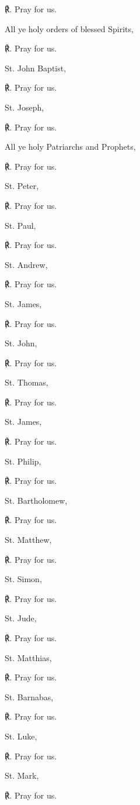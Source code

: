 \begin{multicols}{2}
℟. Pray for us.\par\noindent
All ye holy orders of blessed Spirits,\par
℟. Pray for us.\par\noindent
St. John Baptist,\par
℟. Pray for us.\par\noindent
St. Joseph,\par
℟. Pray for us.\par\noindent
All ye holy Patriarchs and Prophets,\par
℟. Pray for us.\par\noindent
St. Peter,\par
℟. Pray for us.\par\noindent
St. Paul,\par
℟. Pray for us.\par\noindent
St. Andrew,\par
℟. Pray for us.\par\noindent
St. James,\par
℟. Pray for us.\par\noindent
St. John,\par
℟. Pray for us.\par\noindent
St. Thomas,\par
℟. Pray for us.\par\noindent
St. James,\par
℟. Pray for us.\par\noindent
St. Philip,\par
℟. Pray for us.\par\noindent
St. Bartholomew,\par
℟. Pray for us.\par\noindent
St. Matthew,\par
℟. Pray for us.\par\noindent
St. Simon,\par
℟. Pray for us.\par\noindent
St. Jude,\par
℟. Pray for us.\par\noindent
St. Matthias,\par
℟. Pray for us.\par\noindent
St. Barnabas,\par
℟. Pray for us.\par\noindent
St. Luke,\par
℟. Pray for us.\par\noindent
St. Mark,\par
℟. Pray for us.\par\noindent

\end{multicols}
